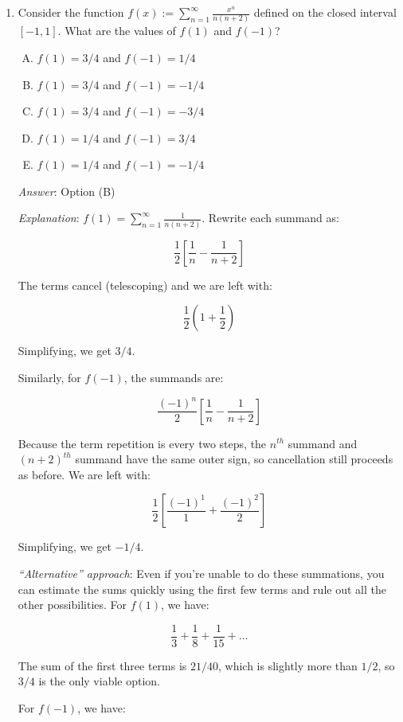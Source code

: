 \documentclass[10pt]{amsart}
\begin{document}
\begin{enumerate}

\item Consider the function $f(x) := \sum_{n=1}^\infty
  \frac{x^n}{n(n + 2)}$ defined on the closed interval
  $[-1,1]$. What are the values of $f(1)$ and $f(-1)$?

  \begin{enumerate}[(A)]
  \item $f(1) = 3/4$ and $f(-1) = 1/4$
  \item $f(1) = 3/4$ and $f(-1) = -1/4$
  \item $f(1) = 3/4$ and $f(-1) = -3/4$
  \item $f(1) = 1/4$ and $f(-1) = 3/4$
  \item $f(1) = 1/4$ and $f(-1) = -1/4$
  \end{enumerate}

  {\em Answer}: Option (B)

  {\em Explanation}: $f(1) =
  \sum_{n=1}^\infty\frac{1}{n(n+2)}$. Rewrite each summand as:

  $$\frac{1}{2}\left[\frac{1}{n} - \frac{1}{n + 2}\right]$$

  The terms cancel (telescoping) and we are left with:

  $$\frac{1}{2}\left(1 + \frac{1}{2}\right)$$

  Simplifying, we get $3/4$.

  Similarly, for $f(-1)$, the summands are:

  $$\frac{(-1)^n}{2}\left[\frac{1}{n} - \frac{1}{n + 2}\right]$$

  Because the term repetition is every two steps, the $n^{th}$ summand
  and $(n+2)^{th}$ summand have the same outer sign, so cancellation
  still proceeds as before. We are left with:

  $$\frac{1}{2}\left[\frac{(-1)^1}{1} + \frac{(-1)^2}{2}\right]$$

  Simplifying, we get $-1/4$.

  {\em ``Alternative'' approach}: Even if you're unable to do these
  summations, you can estimate the sums quickly using the first few
  terms and rule out all the other possibilities. For $f(1)$, we have:

  $$\frac{1}{3} + \frac{1}{8} + \frac{1}{15} + \dots$$

  The sum of the first three terms is $21/40$, which is slightly more
  than $1/2$, so $3/4$ is the only viable option.

  For $f(-1)$, we have:


\end{enumerate}
\end{document}
